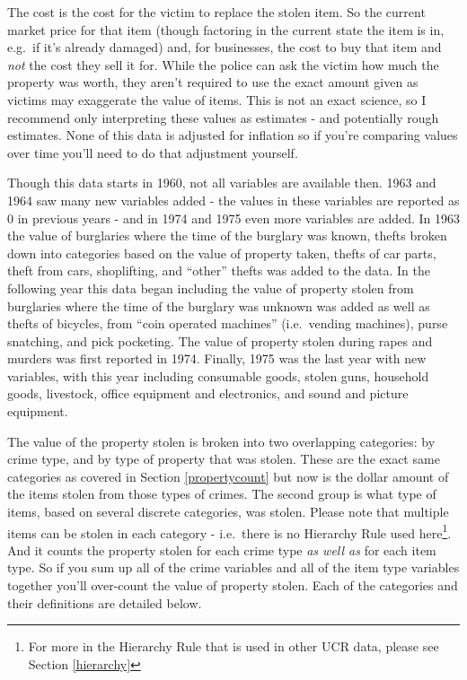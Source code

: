\documentclass[
]{krantz}
\begin{document}
The cost is the cost for the victim to replace the stolen
item. So the current market price for that item (though
factoring in the current state the item is in, e.g.~if it's
already damaged) and, for businesses, the cost to buy that
item and \emph{not} the cost they sell it for. While the
police can ask the victim how much the property was worth,
they aren't required to use the exact amount given as
victims may exaggerate the value of items. This is not an
exact science, so I recommend only interpreting these values
as estimates - and potentially rough estimates. None of this
data is adjusted for inflation so if you're comparing values
over time you'll need to do that adjustment yourself.

Though this data starts in 1960, not all variables are
available then. 1963 and 1964 saw many new variables added -
the values in these variables are reported as 0 in previous
years - and in 1974 and 1975 even more variables are added.
In 1963 the value of burglaries where the time of the
burglary was known, thefts broken down into categories based
on the value of property taken, thefts of car parts, theft
from cars, shoplifting, and ``other'' thefts was added to
the data. In the following year this data began including
the value of property stolen from burglaries where the time
of the burglary was unknown was added as well as thefts of
bicycles, from ``coin operated machines'' (i.e.~vending
machines), purse snatching, and pick pocketing. The value of
property stolen during rapes and murders was first reported
in 1974. Finally, 1975 was the last year with new variables,
with this year including consumable goods, stolen guns,
household goods, livestock, office equipment and
electronics, and sound and picture equipment.

The value of the property stolen is broken into two
overlapping categories: by crime type, and by type of
property that was stolen. These are the exact same
categories as covered in Section \ref{propertycount} but now
is the dollar amount of the items stolen from those types of
crimes. The second group is what type of items, based on
several discrete categories, was stolen. Please note that
multiple items can be stolen in each category - i.e.~there
is no Hierarchy Rule used here\footnote{For more in the
  Hierarchy Rule that is used in other UCR data, please see
  Section \ref{hierarchy}}. And it counts the property
stolen for each crime type \emph{as well as} for each item
type. So if you sum up all of the crime variables and all of
the item type variables together you'll over-count the value
of property stolen. Each of the categories and their
definitions are detailed below.
\end{document}
